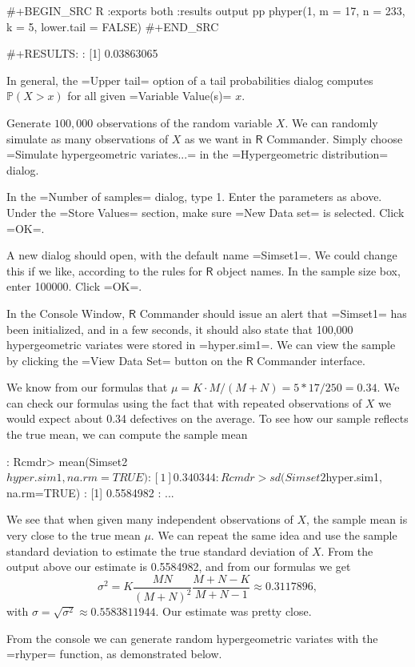 {#+BEGIN_SRC R :exports both :results output pp  
phyper(1, m = 17, n = 233, k = 5, lower.tail = FALSE)
#+END_SRC

#+RESULTS:
: [1] 0.03863065

In general, the =Upper tail= option of a tail probabilities dialog
computes \(\mathbb{P}(X > x)\) for all given =Variable Value(s)=
\(x\).  

Generate \(100,000\) observations of the random variable
\(X\).  We can randomly simulate as many observations of \(X\) as we want in \(\mathsf{R}\) Commander. Simply choose =Simulate hypergeometric variates...= in the =Hypergeometric distribution= dialog. 

In the =Number of samples= dialog, type 1. Enter the parameters as
above. Under the =Store Values= section, make sure =New Data set= is
selected. Click =OK=.

A new dialog should open, with the default name =Simset1=.  We could
change this if we like, according to the rules for \(\mathsf{R}\)
object names. In the sample size box, enter 100000. Click =OK=.

In the Console Window, \(\mathsf{R}\) Commander should issue an alert
that =Simset1= has been initialized, and in a few seconds, it should
also state that 100,000 hypergeometric variates were stored in
=hyper.sim1=. We can view the sample by clicking the =View Data Set=
button on the \(\mathsf{R}\) Commander interface.

We know from our formulas that \(\mu=K\cdot
M/(M+N)=5*17/250=0.34\). We can check our formulas using the fact that
with repeated observations of \(X\) we would expect about 0.34
defectives on the average. To see how our sample reflects the true
mean, we can compute the sample mean

:  Rcmdr> mean(Simset2$hyper.sim1, na.rm=TRUE)
:  [1] 0.340344

:  Rcmdr> sd(Simset2$hyper.sim1, na.rm=TRUE)
:  [1] 0.5584982
:  ...

We see that when given many independent observations of \(X\), the
sample mean is very close to the true mean \(\mu\). We can repeat the
same idea and use the sample standard deviation to estimate the true
standard deviation of \(X\). From the output above our estimate is
0.5584982, and from our formulas we get
\[
\sigma^{2}=K\frac{MN}{(M+N)^{2}}\frac{M+N-K}{M+N-1}\approx0.3117896,
\]
with \(\sigma=\sqrt{\sigma^{2}}\approx0.5583811944\). Our estimate was
pretty close.

From the console we can generate random hypergeometric variates with
the =rhyper= function, as demonstrated below.

}
